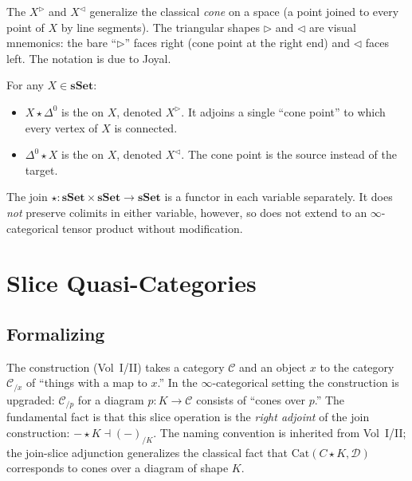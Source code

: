 \begin{nameorigin}
The  $X^\rhd$ and  $X^\lhd$ generalize
the classical \emph{cone} on a space (a point joined to every point of
$X$ by line segments). The triangular shapes $\rhd$ and $\lhd$ are
visual mnemonics: the bare ``$\rhd$'' faces right (cone point at the
right end) and $\lhd$ faces left. The notation is due to Joyal.
\end{nameorigin}

\begin{example_thm}[Cones]
\label{ex:cones}
For any $X \in \mathbf{sSet}$:
\begin{itemize}
  \item $X \star \Delta^0$ is the  on $X$, denoted
        $X^\rhd$. It adjoins a single ``cone point'' to which every
        vertex of $X$ is connected.
  \item $\Delta^0 \star X$ is the  on $X$, denoted
        $X^\lhd$. The cone point is the source instead of the target.
\end{itemize}
\end{example_thm}

\begin{theorem}
\label{thm:join-functor}
The join $\star : \mathbf{sSet} \times \mathbf{sSet} \to \mathbf{sSet}$
is a functor in each variable separately. It does \emph{not} preserve
colimits in either variable, however, so does not extend to an
$\infty$-categorical tensor product without modification.
\end{theorem}


\section{Slice Quasi-Categories}
\label{sec:slices}

\subsection{Formalizing}

\begin{nameorigin}
The  construction (Vol~I/II) takes a category
$\mathcal{C}$ and an object $x$ to the category $\mathcal{C}_{/x}$ of
``things with a map to $x$.'' In the $\infty$-categorical setting the
construction is upgraded: $\mathcal{C}_{/p}$ for a diagram $p : K \to
\mathcal{C}$ consists of ``cones over $p$.'' The fundamental fact is
that this slice operation is the \emph{right adjoint} of the join
construction: $- \star K \dashv (-)_{/K}$. The naming convention is
inherited from Vol~I/II; the join-slice adjunction generalizes the
classical fact that $\mathrm{Cat}(C \star K, \mathcal{D})$ corresponds
to cones over a diagram of shape $K$.
\end{nameorigin}

